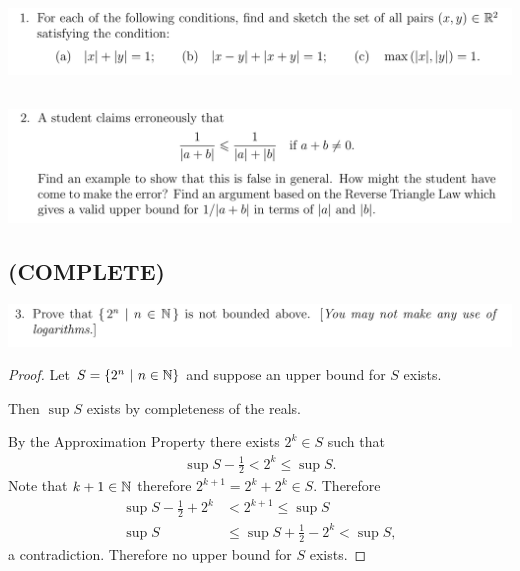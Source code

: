 \documentclass[12pt]{article}
\begin{document}
\newpage
\subsection{}
\begin{mdframed}
  \includegraphics[width=400pt]{img/oxford-M2-analysis-I-2-1.png}
\end{mdframed}

\newpage
\subsection{}
\begin{mdframed}
  \includegraphics[width=400pt]{img/oxford-M2-analysis-I-2-2.png}
\end{mdframed}

\newpage
\subsection{(COMPLETE)}
\begin{mdframed}
  \includegraphics[width=400pt]{img/oxford-M2-analysis-I-2-3.png}
\end{mdframed}

\begin{proof}
  Let $S = \{2^n ~|~ n \in \mathbb{N}\}$ and suppose an upper bound for $S$ exists.

  Then $\sup S$ exists by completeness of the reals.

  By the Approximation Property there exists $2^k \in S$ such that
  \begin{align*}
    \sup S - \frac{1}{2} < 2^k \leq \sup S.
  \end{align*}
  Note that $k+1 \in \mathbb{N}$ therefore $2^{k+1} = 2^k + 2^k \in S$. Therefore
  \begin{align*}
    \sup S - \frac{1}{2} + 2^k &< 2^{k+1} \leq \sup S\\
    \sup S &\leq \sup S + \frac{1}{2} - 2^k < \sup S,
  \end{align*}
  a contradiction. Therefore no upper bound for $S$ exists.
\end{proof}
\end{document}
